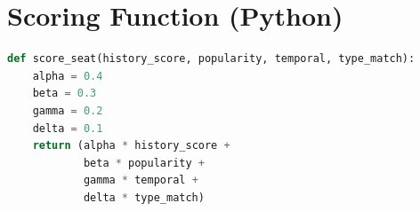 \documentclass[12pt,a4paper]{report} %
\begin{document}
\chapter{Scoring Function (Python)}
\label{appendix:scoring}

\begin{lstlisting}[language=Python, caption=Seat Scoring Function (Python), label=lst:scoring-function]
def score_seat(history_score, popularity, temporal, type_match):
    alpha = 0.4
    beta = 0.3
    gamma = 0.2
    delta = 0.1
    return (alpha * history_score +
            beta * popularity +
            gamma * temporal +
            delta * type_match)
\end{lstlisting}



\end{document}
